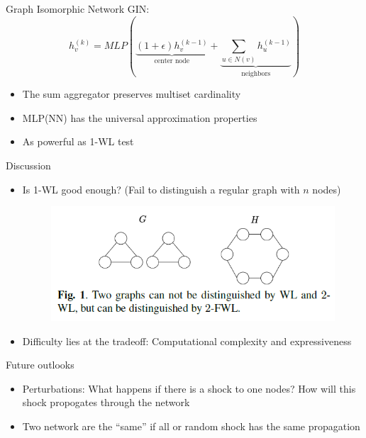 \documentclass[aspectratio=169]{beamer} %
\begin{document}
\begin{frame}{Graph Isomorphic Network}
GIN:
$$
h^{(k)}_v = MLP\left(\underbrace{(1+\epsilon)h^{(k-1)}_v}_{\text{center node}}+\underbrace{\sum_{u\in N(v)} h^{(k-1)}_u}_{\text{neighbors}}\right)
$$
\begin{itemize}
    \item The sum aggregator preserves multiset cardinality
    \item MLP(NN) has the universal approximation properties
    \item As powerful as 1-WL test
\end{itemize}
\end{frame}
\begin{frame}{Discussion}
\begin{itemize}
    \item Is 1-WL good enough? (Fail to distinguish a regular graph with $n$ nodes)
    \begin{figure}
        \centering
        \includegraphics[width=0.7\linewidth]{Network/Graph Neural Network/1-WL fail.png}
    \end{figure}
    \item Difficulty lies at the tradeoff: Computational complexity and expressiveness 
\end{itemize}
    
\end{frame}
\begin{frame}{Future outlooks}
\begin{itemize}
\item Perturbations: What happens if there is a shock to one nodes? How will this shock propogates through the network
\item Two network are the ``same'' if all or random shock has the same propagation
\end{itemize}
\end{frame}
\end{document}
